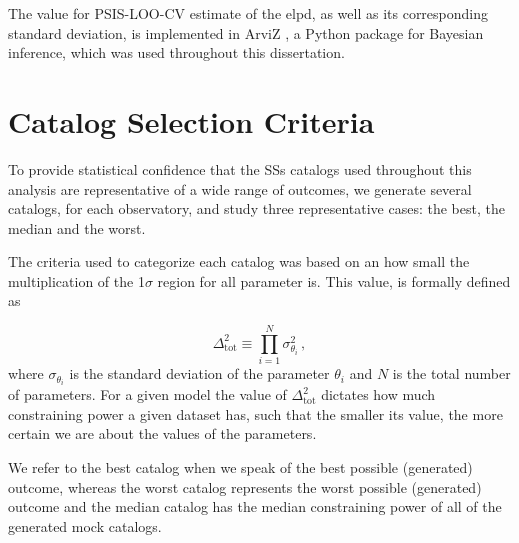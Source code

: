The value for \gls{PSIS-LOO-CV} estimate of the \gls{elpd}, as well as its corresponding standard deviation, is implemented in ArviZ \cite{arviz}, a Python package for Bayesian inference, which was used throughout this dissertation.


\section{Catalog Selection Criteria}
\label{sec:catalog-selection-criteria}

To provide statistical confidence that the \glspl{SS} catalogs used throughout this analysis are representative of a wide range of outcomes, we generate several catalogs, for each observatory, and study three representative cases: the best, the median and the worst.

The criteria used to categorize each catalog was based on an how small the multiplication of the 1$\sigma$ region for all parameter is. This value, is formally defined as

\begin{equation}
    \Delta^2_\text{tot} \equiv \prod_{i=1}^N \sigma^2_{\theta_i} \,,
\end{equation}
where $\sigma_{\theta_i}$ is the standard deviation of the parameter $\theta_i$ and $N$ is the total number of parameters. For a given model the value of $\Delta^2_\text{tot}$ dictates how much constraining power a given dataset has, such that the smaller its value, the more certain we are about the values of the parameters.

We refer to the best catalog when we speak of the best possible (generated) outcome, whereas the worst catalog represents the worst possible (generated) outcome and the median catalog has the median constraining power of all of the generated mock catalogs.
